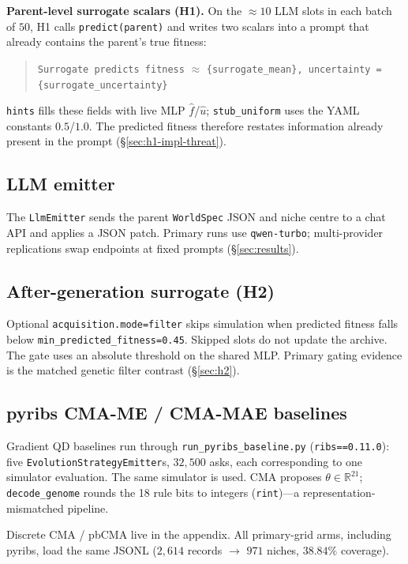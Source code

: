 \documentclass[preprint,12pt]{elsarticle}
\begin{document}
\textbf{Parent-level surrogate scalars (H1).}
On the ${\approx}10$ LLM slots in each batch of $50$, H1 calls \texttt{predict(parent)} and writes two scalars into a prompt that already contains the parent's true fitness:
\begin{quote}
\small\texttt{Surrogate predicts fitness} $\approx$ \texttt{\{surrogate\_mean\}, uncertainty = \{surrogate\_uncertainty\}}
\end{quote}
\texttt{hints} fills these fields with live MLP $\hat f$/$\hat u$; \texttt{stub\_uniform} uses the YAML constants $0.5$/$1.0$. The predicted fitness therefore restates information already present in the prompt (\S\ref{sec:h1-impl-threat}).

\subsection{LLM emitter}

The \texttt{LlmEmitter} sends the parent \texttt{WorldSpec} JSON and niche centre to a chat API and applies a JSON patch. Primary runs use \texttt{qwen-turbo}; multi-provider replications swap endpoints at fixed prompts (\S\ref{sec:results}).

\subsection{After-generation surrogate (H2)}
\label{sec:acquisition}
\label{sec:mixed-2x2-design}

Optional \texttt{acquisition.mode=filter} skips simulation when predicted fitness falls below \texttt{min\_predicted\_fitness=0.45}. Skipped slots do not update the archive. The gate uses an absolute threshold on the shared MLP. Primary gating evidence is the matched genetic filter contrast (\S\ref{sec:h2}).

\subsection{pyribs CMA-ME / CMA-MAE baselines}
\label{sec:pyribs}

Gradient QD baselines run through \texttt{run\_pyribs\_baseline.py} (\texttt{ribs==0.11.0}): five \texttt{EvolutionStrategyEmitter}s, $32{,}500$ asks, each corresponding to one simulator evaluation. The same simulator is used. CMA proposes $\theta\in\mathbb{R}^{21}$; \texttt{decode\_genome} rounds the 18 rule bits to integers (\texttt{rint})---a representation-mismatched pipeline.

Discrete CMA / pbCMA live in the appendix. All primary-grid arms, including pyribs, load the same JSONL ($2{,}614$ records $\rightarrow$ $971$ niches, $38.84\%$ coverage).
\end{document}
